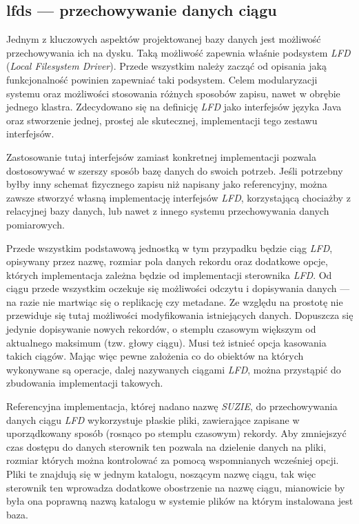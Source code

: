 \documentclass[a4paper,polish,12pt,twoside]{article}
\begin{document}
     \subsection{lfds --- przechowywanie danych ciągu}
		\label{sec:part:lfds}
Jednym z kluczowych aspektów projektowanej bazy danych jest możliwość przechowywania ich na dysku. Taką możliwość zapewnia właśnie podsystem \textit{LFD} (\textit{Local Filesystem Driver}). Przede wszystkim należy zacząć od opisania jaką funkcjonalność powinien zapewniać taki podsystem. Celem modularyzacji systemu oraz możliwości stosowania różnych sposobów zapisu, nawet w obrębie jednego klastra. Zdecydowano się na definicję \textit{LFD} jako interfejsów języka Java oraz stworzenie jednej, prostej ale skutecznej, implementacji tego zestawu interfejsów.

Zastosowanie tutaj interfejsów zamiast konkretnej implementacji pozwala dostosowywać w szerszy sposób bazę danych do swoich potrzeb. Jeśli potrzebny byłby inny schemat fizycznego zapisu niż napisany jako referencyjny, można zawsze stworzyć własną implementację interfejsów \textit{LFD}, korzystającą chociażby z relacyjnej bazy danych, lub nawet z innego systemu przechowywania danych pomiarowych.

Przede wszystkim podstawową jednostką w tym przypadku będzie ciąg \textit{LFD}, opisywany przez nazwę, rozmiar pola danych rekordu oraz dodatkowe opcje, których implementacja zależna będzie od implementacji sterownika \textit{LFD}. Od ciągu przede wszystkim oczekuje się możliwości odczytu i dopisywania danych --- na razie nie martwiąc się o replikację czy metadane. Ze względu na prostotę nie przewiduje się tutaj możliwości modyfikowania istniejących danych. Dopuszcza się jedynie dopisywanie nowych rekordów, o stemplu czasowym większym od aktualnego maksimum (tzw. głowy ciągu). Musi też istnieć opcja kasowania takich ciągów. Mając więc pewne założenia co do obiektów na których wykonywane są operacje, dalej nazywanych ciągami \textit{LFD}, można przystąpić do zbudowania implementacji takowych.
	
Referencyjna implementacja, której nadano nazwę \textit{SUZIE}, do przechowywania danych ciągu \textit{LFD} wykorzystuje płaskie pliki, zawierające zapisane w uporządkowany sposób (rosnąco po stemplu czasowym) rekordy. Aby zmniejszyć czas dostępu do danych sterownik ten pozwala na dzielenie danych na pliki, rozmiar których można kontrolować za pomocą wspomnianych wcześniej opcji. Pliki te znajdują się w jednym katalogu, noszącym nazwę ciągu, tak więc sterownik ten wprowadza dodatkowe obostrzenie na nazwę ciągu, mianowicie by była ona poprawną nazwą katalogu w systemie plików na którym instalowana jest baza.
\end{document}
